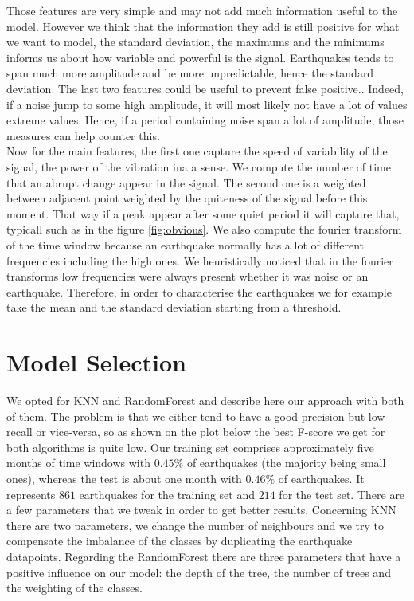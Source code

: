 \documentclass[10pt,conference,compsocconf]{IEEEtran}
\begin{document}
Those features are very simple and may not add much information useful to the model. However we think that the information they add is still positive for what we want to model, the standard deviation, the maximums and the minimums informs us about how variable and powerful is the signal. Earthquakes tends to span much more amplitude and be more unpredictable, hence the standard deviation. The last two features could be useful to prevent false positive.. Indeed, if a noise jump to some high amplitude, it will most likely not have a lot of values extreme values. Hence, if a period containing noise span a lot of amplitude, those measures can help counter this.\\
Now for the main features, the first one capture the speed of variability of the signal, the power of the vibration ina a sense. We compute the number of time that an abrupt change appear in the signal. The second one is a weighted
between adjacent point weighted by the quiteness of the signal before this moment. That way if a peak appear after some quiet period it will capture that, typicall such as in the figure \ref{fig:obvious}. We also compute the fourier transform of the time window because an earthquake normally has a lot of different frequencies including the high ones. We heuristically noticed that in the fourier transforms low frequencies were always present whether it was noise or an earthquake. Therefore, in order to characterise the earthquakes we for example take the mean and the standard deviation starting from a threshold.

\section{Model Selection}
We opted for KNN and RandomForest and describe here our approach with both of them. The problem is that we either tend to have a good precision but low recall or vice-versa, so as shown on the plot below the best F-score we get for both algorithms is quite low. Our training set comprises approximately five months of time windows with $0.45\%$ of earthquakes (the majority being small ones), whereas the test is about one month with $0.46\%$ of earthquakes. It represents $861$ earthquakes for the training set and $214$ for the test set. There are a few parameters that we tweak in order to get better results. Concerning KNN there are two parameters, we change the number of neighbours and we try to compensate the imbalance of the classes by duplicating the earthquake datapoints. Regarding the RandomForest there are three parameters that have a positive influence on our model: the depth of the tree, the number of trees and the weighting of the classes.
\end{document}
